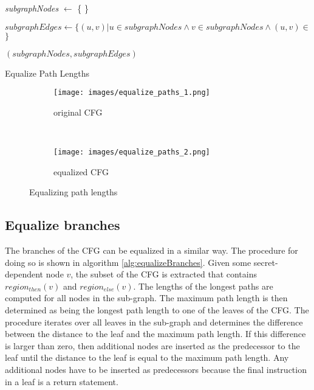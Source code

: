 \begin{algorithm*}
{   
  
  \textit{subgraphNodes} $\leftarrow$  \{ \} \\
   
  
  $subgraphEdges \leftarrow \{ (u, v) \vert u \in subgraphNodes \land v \in subgraphNodes \land (u, v) \in $  $\}$

	\KwRet $(subgraphNodes, subgraphEdges)$
  }
  
  \caption{Equalize Path Lengths}
  \label{alg:equalizePaths}
\end{algorithm*}

\begin{figure*}[t!]
    \centering
    \begin{subfigure}[t]{0.5\textwidth}
        \centering
        \texttt{[image: images/equalize\_paths\_1.png]}
        \caption{original CFG}
        \label{fig:equalize-paths-1}
    \end{subfigure}%
    ~
    \begin{subfigure}[t]{0.5\textwidth}
        \centering
        \texttt{[image: images/equalize\_paths\_2.png]}
        \caption{equalized CFG}
        \label{fig:equalize-paths-2}
    \end{subfigure}
    \caption{Equalizing path lengths}
    \label{fig:equalize-paths}
\end{figure*}

\subsection{Equalize branches}
The branches of the CFG can be equalized in a similar way. 
The procedure for doing so is shown in algorithm \ref{alg:equalizeBranches}.
Given some secret-dependent node $v$, the subset of the CFG is extracted that contains $region_{then}(v)$ and $region_{else}(v)$. 
The lengths of the longest paths are computed for all nodes in the sub-graph. 
The maximum path length is then determined as being the longest path length to one of the leaves of the CFG.
The procedure iterates over all leaves in the sub-graph and determines the difference between the distance to the leaf and the maximum path length. 
If this difference is larger than zero, then additional nodes are inserted as the predecessor to the leaf until the distance to the leaf is equal to the maximum 
path length.
Any additional nodes have to be inserted as predecessors because the final instruction in a leaf is a return statement. 


